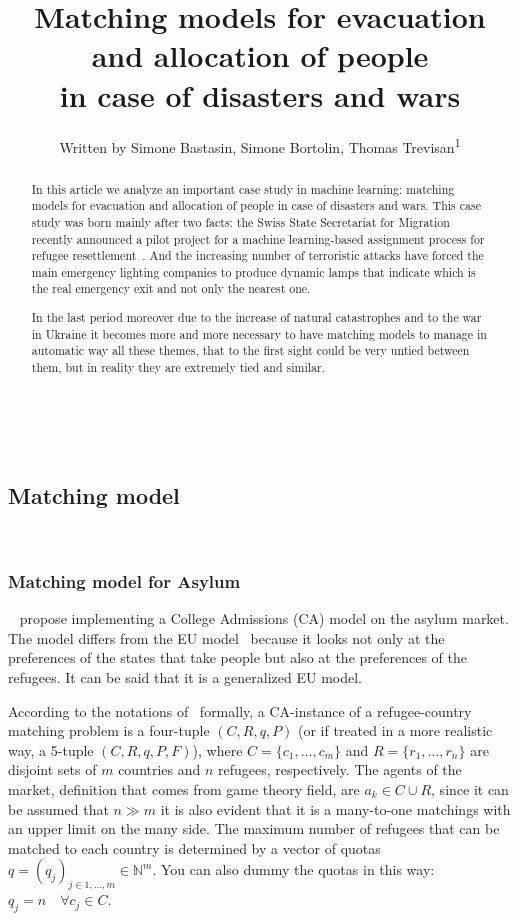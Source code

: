 \documentclass[letterpaper]{article} %
\title{Matching models for evacuation and allocation of people\\in case of disasters and wars}
\author{
    Written by Simone Bastasin, Simone Bortolin, Thomas Trevisan\textsuperscript{\rm 1}
    \\
}
\begin{document}
    \maketitle

    \begin{abstract}
        In this article we analyze an important case study in machine learning: matching models for evacuation and
        allocation of people in case of disasters and wars. This case study was born mainly after two facts:
        the Swiss State Secretariat for Migration recently announced a pilot project for a machine
        learning-based assignment process for refugee resettlement~\citet{olbergml}.
        And the increasing number of terroristic attacks have forced the main emergency lighting companies to produce
        dynamic lamps that indicate which is the real emergency exit and not only the nearest one.

        In the last period moreover due to the increase of natural catastrophes and to the war in Ukraine it becomes
        more and more necessary to have matching models to manage in automatic way all these themes, that to the first
        sight could be very untied between them, but in reality they are extremely tied and similar.
    \end{abstract}

    \noindent%
    ~\citet{olbergml,basshuysen,delacretaz_2020,andersson}

    \subsection{Matching model}\label{matching-model}%
    ~\citet{olbergml,basshuysen,delacretaz_2020}

    \subsubsection{Matching model for Asylum}\label{matching-model-for-asylum}%
    ~\citet{olbergml,basshuysen,delacretaz_2020,fernandez} propose implementing a College Admissions (CA)
    model on the asylum market.
    The model differs from the EU model~\citet{basshuysen} because it looks not only at the preferences of the states
    that take people but also at the preferences of the refugees.
    It can be said that it is a generalized EU model.

    According to the notations of~\citet{salles} formally, a CA-instance of a refugee-country matching problem is a
    four-tuple \((C, R, q, P)\) (or if treated in a more realistic way, a 5-tuple \((C, R, q, P, F)\)), where
    \(C = \{c_1, \dots, c_m\}\) and \(R = \{r_1, \dots,r_n\}\) are disjoint sets of \(m\) countries and \(n\) refugees,
    respectively.
    The agents of the market, definition that comes from game theory field, are \(a_k \in C\cup R\),
    since it can be assumed that \(n \gg m\) it is also evident that it is a many-to-one matchings with an upper limit
    on the many side.
    The maximum number of refugees that can be matched to
    each country is determined by a vector of quotas \(q = (q_j)_{j\in {1,...,m}} \in \mathbb{N}^m\).
    You can also dummy the quotas in this way:  \(q_j = n \quad  \forall c_j \in C\).
\end{document}
